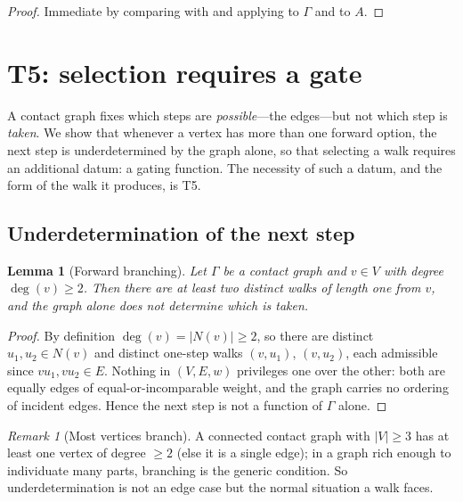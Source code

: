 \documentclass[11pt,a4paper]{article}
\theoremstyle{thmstyle}
\newtheorem{lemma}[theorem]{Lemma}
\theoremstyle{definition}
\theoremstyle{remark}
\newtheorem{remark}[theorem]{Remark}
\newcommand{\Gph}{\Gamma}                 %
\newcommand{\V}{V}                        %
\newcommand{\E}{E}                        %
\newcommand{\wt}{w}                       %
\newcommand{\Nbr}{N}                      %
\newcommand{\Agent}{A}                    %
\newcommand{\abs}[1]{\lvert#1\rvert}
\begin{document}
\begin{proof}
Immediate by comparing  with  and applying
 to $\Gph$ and to $\Agent$.
\end{proof}


\section{T5: selection requires a gate}
\label{sec:gating}

A contact graph fixes which steps are \emph{possible}---the edges---but not which
step is \emph{taken}. We show that whenever a vertex has more than one forward
option, the next step is underdetermined by the graph alone, so that selecting a
walk requires an additional datum: a gating function. The necessity of such a
datum, and the form of the walk it produces, is T5.

\subsection{Underdetermination of the next step}

\begin{lemma}[Forward branching]
\label{lem:branching}
Let $\Gph$ be a contact graph and $v\in\V$ with degree $\deg(v)\ge 2$. Then there
are at least two distinct walks of length one from $v$, and the graph alone does
not determine which is taken.
\end{lemma}

\begin{proof}
By definition $\deg(v)=\abs{\Nbr(v)}\ge2$, so there are distinct
$u_1,u_2\in\Nbr(v)$ and distinct one-step walks $(v,u_1)$, $(v,u_2)$, each
admissible since $vu_1,vu_2\in\E$. Nothing in $(\V,\E,\wt)$ privileges one over
the other: both are equally edges of equal-or-incomparable weight, and the graph
carries no ordering of incident edges. Hence the next step is not a function of
$\Gph$ alone.
\end{proof}

\begin{remark}[Most vertices branch]
\label{rem:branch-generic}
A connected contact graph with $\abs{\V}\ge3$ has at least one vertex of degree
$\ge2$ \textup{(}else it is a single edge\textup{)}; in a graph rich enough to
individuate many parts, branching is the generic condition. So
underdetermination is not an edge case but the normal situation a walk faces.
\end{remark}
\end{document}
